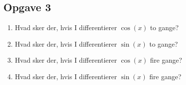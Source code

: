 \subsection*{Opgave 3}
\begin{enumerate}[label=\roman*)]
	\item Hvad sker der, hvis I differentierer $\cos(x)$ to gange?
	\item Hvad sker der, hvis I differentierer $\sin(x)$ to gange?
	\item Hvad sker der, hvis I differentierer $\cos(x)$ fire gange?
	\item Hvad sker der, hvis I differentierer $\sin(x)$ fire gange?
\end{enumerate}

